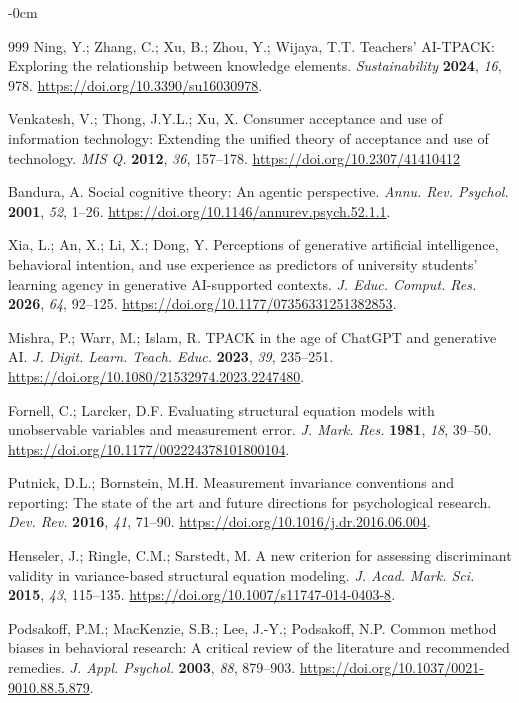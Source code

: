 \documentclass[sustainability,article,accept,moreauthors]{Definitions/mdpi}
\begin{document}
\begin{adjustwidth}{-\extralength}{0cm}
\begin{thebibliography}{999}
Ning, Y.; Zhang, C.; Xu, B.; Zhou, Y.; Wijaya, T.T. Teachers' AI-TPACK: Exploring the relationship between knowledge elements. \textit{Sustainability} \textbf{2024}, \textit{16}, 978. \url{https://doi.org/10.3390/su16030978}.

Venkatesh, V.; Thong, J.Y.L.; Xu, X. Consumer acceptance and use of information technology: Extending the unified theory of acceptance and use of technology. \textit{MIS Q.} \textbf{2012}, \textit{36}, 157--178. \url{https://doi.org/10.2307/41410412}

Bandura, A. Social cognitive theory: An agentic perspective. \textit{Annu. Rev. Psychol.} \textbf{2001}, \textit{52}, 1--26. \url{https://doi.org/10.1146/annurev.psych.52.1.1}.



Xia, L.; An, X.; Li, X.; Dong, Y. Perceptions of generative artificial intelligence, behavioral intention, and use experience as predictors of university students' learning agency in generative AI-supported contexts. \textit{J. Educ. Comput. Res.} \textbf{2026}, \textit{64}, 92--125. \url{https://doi.org/10.1177/07356331251382853}.

Mishra, P.; Warr, M.; Islam, R. TPACK in the age of ChatGPT and generative AI. \textit{J. Digit. Learn. Teach. Educ.} \textbf{2023}, \textit{39}, 235--251. \url{https://doi.org/10.1080/21532974.2023.2247480}.

Fornell, C.; Larcker, D.F. Evaluating structural equation models with unobservable variables and measurement error. \textit{J. Mark. Res.} \textbf{1981}, \textit{18}, 39--50. \url{https://doi.org/10.1177/002224378101800104}.

Putnick, D.L.; Bornstein, M.H. Measurement invariance conventions and reporting: The state of the art and future directions for psychological research. \textit{Dev. Rev.} \textbf{2016}, \textit{41}, 71--90. \url{https://doi.org/10.1016/j.dr.2016.06.004}.

Henseler, J.; Ringle, C.M.; Sarstedt, M. A new criterion for assessing discriminant validity in variance-based structural equation modeling. \textit{J. Acad. Mark. Sci.} \textbf{2015}, \textit{43}, 115--135. \url{https://doi.org/10.1007/s11747-014-0403-8}.

Podsakoff, P.M.; MacKenzie, S.B.; Lee, J.-Y.; Podsakoff, N.P. Common method biases in behavioral research: A critical review of the literature and recommended remedies. \textit{J. Appl. Psychol.} \textbf{2003}, \textit{88}, 879--903. \url{https://doi.org/10.1037/0021-9010.88.5.879}.


\end{thebibliography}
\end{adjustwidth}
\end{document}

